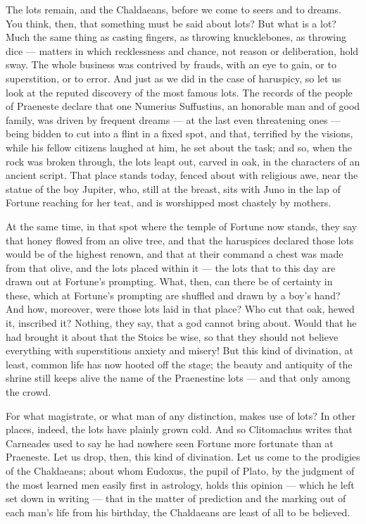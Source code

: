 The lots remain, and the Chaldaeans, before we come to seers and to dreams. You think, then, that something must be said about lots? But what is a lot? Much the same thing as casting fingers, as throwing knucklebones, as throwing dice — matters in which recklessness and chance, not reason or deliberation, hold sway. The whole business was contrived by frauds, with an eye to gain, or to superstition, or to error. And just as we did in the case of haruspicy, so let us look at the reputed discovery of the most famous lots. The records of the people of Praeneste declare that one Numerius Suffustius, an honorable man and of good family, was driven by frequent dreams — at the last even threatening ones — being bidden to cut into a flint in a fixed spot, and that, terrified by the visions, while his fellow citizens laughed at him, he set about the task; and so, when the rock was broken through, the lots leapt out, carved in oak, in the characters of an ancient script. That place stands today, fenced about with religious awe, near the statue of the boy Jupiter, who, still at the breast, sits with Juno in the lap of Fortune reaching for her teat, and is worshipped most chastely by mothers.

 At the same time, in that spot where the temple of Fortune now stands, they say that honey flowed from an olive tree, and that the haruspices declared those lots would be of the highest renown, and that at their command a chest was made from that olive, and the lots placed within it — the lots that to this day are drawn out at Fortune's prompting. What, then, can there be of certainty in these, which at Fortune's prompting are shuffled and drawn by a boy's hand? And how, moreover, were those lots laid in that place? Who cut that oak, hewed it, inscribed it? Nothing, they say, that a god cannot bring about. Would that he had brought it about that the Stoics be wise, so that they should not believe everything with superstitious anxiety and misery! But this kind of divination, at least, common life has now hooted off the stage; the beauty and antiquity of the shrine still keeps alive the name of the Praenestine lots — and that only among the crowd.

 For what magistrate, or what man of any distinction, makes use of lots? In other places, indeed, the lots have plainly grown cold. And so Clitomachus writes that Carneades used to say he had nowhere seen Fortune more fortunate than at Praeneste. Let us drop, then, this kind of divination. Let us come to the prodigies of the Chaldaeans; about whom Eudoxus, the pupil of Plato, by the judgment of the most learned men easily first in astrology, holds this opinion — which he left set down in writing — that in the matter of prediction and the marking out of each man's life from his birthday, the Chaldaeans are least of all to be believed.

